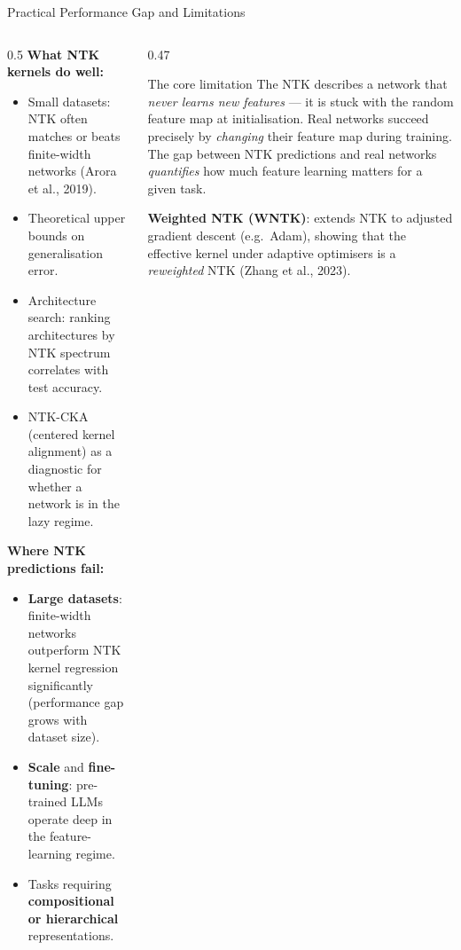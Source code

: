 \documentclass[aspectratio=169, 10pt]{beamer}
\newcommand{\myalert}[1]{\textcolor{red!70!black}{\textbf{#1}}}
\begin{document}
\begin{frame}{Practical Performance Gap and Limitations}
  \begin{columns}[T]
    \begin{column}{0.5\textwidth}
      \textbf{What NTK kernels do well:}
      \begin{itemize}
        \item Small datasets: NTK often matches or beats finite-width networks (Arora et al., 2019).
        \item Theoretical upper bounds on generalisation error.
        \item Architecture search: ranking architectures by NTK spectrum correlates with test accuracy.
        \item NTK-CKA (centered kernel alignment) as a diagnostic for whether a network is in the lazy regime.
      \end{itemize}
      \vspace{0.3em}
      \textbf{Where NTK predictions fail:}
      \begin{itemize}
        \item \myalert{Large datasets}: finite-width networks outperform NTK kernel regression significantly (performance gap grows with dataset size).
        \item \myalert{Scale} and \myalert{fine-tuning}: pre-trained LLMs operate deep in the feature-learning regime.
        \item Tasks requiring \myalert{compositional or hierarchical} representations.
      \end{itemize}
    \end{column}
    \begin{column}{0.47\textwidth}
      \begin{alertblock}{The core limitation}
        The NTK describes a network that \emph{never learns new features} — it is stuck with the random feature map at initialisation. Real networks succeed precisely by \emph{changing} their feature map during training. The gap between NTK predictions and real networks \emph{quantifies} how much feature learning matters for a given task.
      \end{alertblock}
      \vspace{0.4em}
      \small
      \textbf{Weighted NTK (WNTK)}: extends NTK to adjusted gradient descent (e.g.\ Adam), showing that the effective kernel under adaptive optimisers is a \emph{reweighted} NTK (Zhang et al., 2023).
    \end{column}
  \end{columns}
\end{frame}
\end{document}
